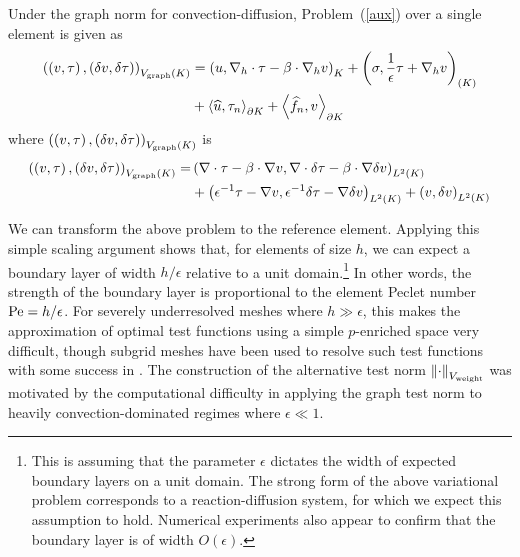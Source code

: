 \documentclass[11pt,onecolumn]{scrartcl}
\newcommand{\nor}[1]{\left\| #1 \right\|}
\newcommand{\LRp}[1]{\left( #1 \right)}
\newcommand{\LRa}[1]{\left\langle #1 \right\rangle}
\newcommand{\Grad} {\ensuremath{\nabla}}
\newcommand{\uh}{\widehat{u}}
\newcommand{\fnh}{\widehat{f}_n}
\newcommand{\grad}{\nabla}
\renewcommand{\div}{\grad \cdot}
\begin{document}
Under the graph norm for convection-diffusion, Problem~(\ref{aux}) over a single element is given as
\begin{align*}
\LRp{\LRp{v,\tau},\LRp{\delta v,\delta \tau}}_{V_{\rm graph}(K)} &= \LRp{u, \Grad_h\cdot \tau - \beta\cdot \Grad_h v}_{K} + \LRp{\sigma, \frac{1}{\epsilon}\tau + \Grad_h v}_{(K)} \\
&+ \LRa{\uh,\tau_n}_{\partial K} + \LRa{\fnh,v}_{\partial K}
\end{align*}
where $\LRp{\LRp{v,\tau},\LRp{\delta v,\delta \tau}}_{V_{\rm graph}(K)}$ is 
\begin{align*}
\LRp{\LRp{v,\tau},\LRp{\delta v,\delta \tau}}_{V_{\rm graph}(K)} =& \LRp{\div\tau - \beta \cdot \grad v,\div\delta \tau - \beta \cdot \grad \delta v}_{L^2(K)} \\
&+ \LRp{{\epsilon}^{-1} \tau -  \grad v,{\epsilon}^{-1} \delta \tau -  \grad \delta v}_{L^2(K)} + \LRp{v,\delta v}_{L^2(K)} 
\end{align*}

We can transform the above problem to the reference element.  Applying this simple scaling argument shows that, for elements of size $h$, we can expect a boundary layer of width $h/\epsilon$ relative to a unit domain.\footnote{This is assuming that the parameter $\epsilon$ dictates the width of expected boundary layers on a unit domain. The strong form of the above variational problem corresponds to a reaction-diffusion system, for which we expect this assumption to hold.  Numerical experiments also appear to confirm that the boundary layer is of width $O(\epsilon)$.}  In other words, the strength of the boundary layer is proportional to the element Peclet number ${\rm Pe} = h/\epsilon$.  For severely underresolved meshes where $h \gg \epsilon$, this makes the approximation of optimal test functions using a simple $p$-enriched space very difficult, though subgrid meshes have been used to resolve such test functions with some success in \cite{DBLP:journals/procedia/NiemiCC11}.  The construction of the alternative test norm $\nor{\cdot}_{V_{\rm weight}}$ was motivated by the computational difficulty in applying the graph test norm to heavily convection-dominated regimes where $\epsilon \ll 1$.  
\end{document}
